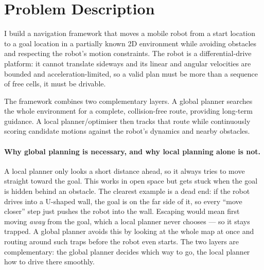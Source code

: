 \section{Problem Description}

I build a navigation framework that moves a mobile robot from a start location to a
goal location in a partially known 2D environment while avoiding obstacles
and respecting the robot's motion constraints. The robot is a differential-drive
platform: it cannot translate sideways and its linear and angular velocities are
bounded and acceleration-limited, so a valid plan must be more than a sequence of
free cells, it must be drivable.

The framework combines two complementary layers. A global planner searches the
whole environment for a complete, collision-free route, providing long-term guidance.
A local planner/optimiser then tracks that route while continuously scoring
candidate motions against the robot's dynamics and nearby obstacles.

\paragraph{Why global planning is necessary, and why local planning alone is not.}
A local planner only looks a short distance ahead, so it always tries to move straight
toward the goal. This works in open space but gets stuck when the goal is hidden behind an
obstacle. The clearest example is a dead end: if the robot drives into a U-shaped
wall, the goal is on the far side of it, so every ``move closer'' step just pushes the
robot into the wall. Escaping would mean first moving \emph{away} from the goal, which a
local planner never chooses --- so it stays trapped. A global planner avoids this by
looking at the whole map at once and routing around such traps before the robot even
starts. The two layers are complementary: the global planner decides which way to
go, the local planner how to drive there smoothly.
